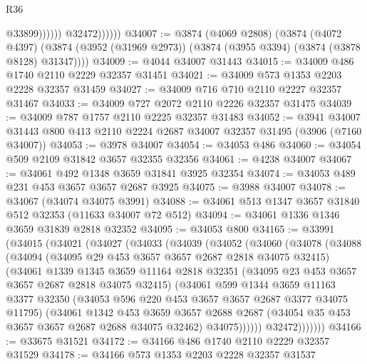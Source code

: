 \begin{lexlean}{R36}
\begin{coremodule}
                            @33899))))))
                @32472))))))
@34007 := @3874
    (@4069 @2808)
    (@3874
      (@4072 @4397)
      (@3874 (@3952 (@31969 @2973)) (@3874 (@3955 @3394) (@3874 (@3878 @8128) @31347))))
@34009 := @4044 @34007 @31443
@34015 := @34009 @486 @1740 @2110 @2229 @32357 @31451
@34021 := @34009 @573 @1353 @2203 @2228 @32357 @31459
@34027 := @34009 @716 @710 @2110 @2227 @32357 @31467
@34033 := @34009 @727 @2072 @2110 @2226 @32357 @31475
@34039 := @34009 @787 @1757 @2110 @2225 @32357 @31483
@34052 := @3941
    @34007
    @31443
    @800
    @413
    @2110
    @2224
    @2687
    @34007
    @32357
    @31495
    (@3906 (@7160 @34007))
@34053 := @3978 @34007
@34054 := @34053 @486
@34060 := @34054 @509 @2109 @31842 @3657 @32355 @32356
@34061 := @4238 @34007
@34067 := @34061 @492 @1348 @3659 @31841 @3925 @32354
@34074 := @34053 @489 @231 @453 @3657 @3657 @2687 @3925
@34075 := @3988 @34007
@34078 := @34067 (@34074 @34075 @3991)
@34088 := @34061 @513 @1347 @3657 @31840 @512 @32353 (@11633 @34007 @72 @512)
@34094 := @34061 @1336 @1346 @3659 @31839 @2818 @32352
@34095 := @34053 @800
@34165 := @33991
    (@34015
      (@34021
        (@34027
          (@34033
            (@34039
              (@34052
                (@34060
                  (@34078
                    (@34088
                      (@34094
                        (@34095 @29 @453 @3657 @3657 @2687 @2818 @34075 @32415)
                        (@34061
                          @1339
                          @1345
                          @3659
                          @11164
                          @2818
                          @32351
                          (@34095 @23 @453 @3657 @3657 @2687 @2818 @34075 @32415)
                          (@34061
                            @599
                            @1344
                            @3659
                            @11163
                            @3377
                            @32350
                            (@34053 @596 @220 @453 @3657 @3657 @2687 @3377 @34075 @11795)
                            (@34061
                              @1342
                              @453
                              @3659
                              @3657
                              @2688
                              @2687
                              (@34054 @35 @453 @3657 @3657 @2687 @2688 @34075 @32462)
                              @34075))))))
                  @32472)))))))
@34166 := @33675 @31521
@34172 := @34166 @486 @1740 @2110 @2229 @32357 @31529
@34178 := @34166 @573 @1353 @2203 @2228 @32357 @31537

\end{coremodule}
\end{lexlean}

